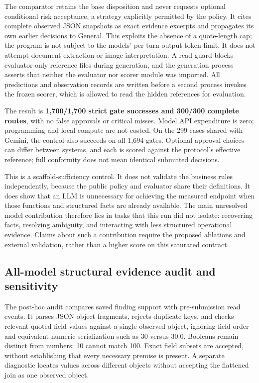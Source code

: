 The comparator retains the base disposition and never requests optional conditional risk
acceptance, a strategy explicitly permitted by the policy. It cites complete observed JSON
snapshots as exact evidence excerpts and propagates its own earlier decisions to General.
This exploits the absence of a quote-length cap; the program is not subject to the models'
per-turn output-token limit. It does not attempt document extraction or
image interpretation. A read guard blocks evaluator-only reference files during generation,
and the generation process asserts that neither the evaluator nor scorer module was imported.
All predictions and observation records are written before a second process invokes the frozen
scorer, which is allowed to read the hidden references for evaluation.

The result is \textbf{1,700/1,700 strict gate successes and 300/300 complete routes}, with no
false approvals or critical misses. Model API expenditure is zero; programming and local
compute are not costed. On the 299 cases shared with Gemini, the control also succeeds on all
1,694 gates. Optional approval choices can differ between systems, and each is scored against
the protocol's effective reference; full conformity does not mean identical submitted decisions.

This is a scaffold-sufficiency control. It does not validate the business rules independently,
because the public policy and evaluator share their definitions. It does show that an LLM is
unnecessary for achieving the measured endpoint when those functions and structured facts are
already available. The main unresolved model contribution therefore lies in tasks that this
run did not isolate: recovering facts, resolving ambiguity, and interacting with less structured
operational evidence. Claims about such a contribution require the proposed ablations and
external validation, rather than a higher score on this saturated contract.

\subsection{All-model structural evidence audit and sensitivity}
\label{sec:structural-audit}
\label{sec:all-model-audit}

The post-hoc audit compares saved finding support with pre-submission read events. It parses
JSON object fragments, rejects duplicate keys, and checks relevant quoted field values against
a single observed object, ignoring field order and equivalent numeric serialization such as
30 versus 30.0. Booleans remain distinct from numbers; 10 cannot match 100. Exact field subsets
are accepted, without establishing that every necessary premise is present. A separate diagnostic
locates values across different objects without accepting the flattened join as one observed object.

